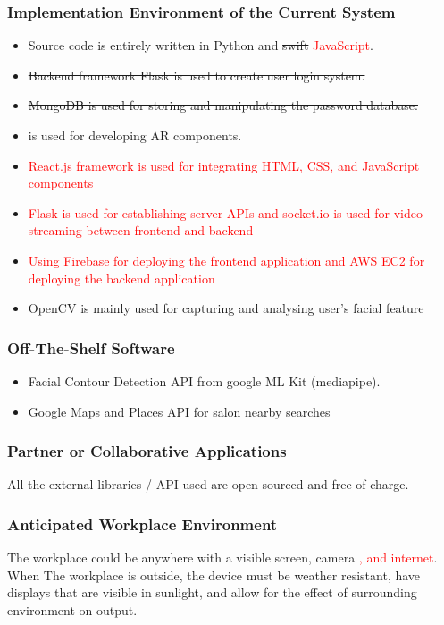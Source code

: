 \documentclass[12pt]{article}
\begin{document}
\subsubsection{Implementation Environment of the Current System}
\begin{itemize}
    \item Source code is entirely written in Python and \sout{swift} \textcolor{red}{JavaScript}.
    \item \sout{Backend framework Flask is used to create user login system.}
    \item \sout{MongoDB is used for storing and manipulating the password database.}
    \item {}is used for developing AR components.
    \item \textcolor{red}{React.js framework is used for integrating HTML, CSS, and JavaScript components}
    \item \textcolor{red}{Flask is used for establishing server APIs and socket.io is used for video streaming between frontend and backend}
    \item \textcolor{red}{Using Firebase for deploying the frontend application and AWS EC2 for deploying the backend application}
    \item OpenCV is mainly used for capturing and analysing user's facial feature
\end{itemize}
\subsubsection{Off-The-Shelf Software}
\begin{itemize}
    \item Facial Contour Detection API from google ML Kit (mediapipe).
    \item Google Maps and Places API for salon nearby searches
\end{itemize}
\subsubsection{Partner or Collaborative Applications}
All the external libraries / API used are open-sourced and free of charge.
\subsubsection{Anticipated Workplace Environment}
The workplace could be anywhere with a visible screen, camera \textcolor{red}{, and internet}. When The workplace is outside, the device must be weather resistant, have displays that are visible in sunlight, and allow for the effect of surrounding environment on output.
\end{document}
